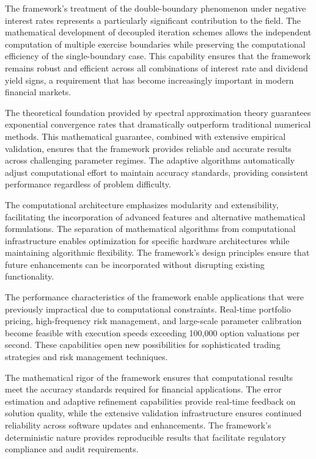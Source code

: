 \documentclass[
  american,
  11pt,
  11pt,
  letterpaper,
  onecolumn]{article}
\begin{document}
The framework's treatment of the double-boundary phenomenon under
negative interest rates represents a particularly significant
contribution to the field. The mathematical development of decoupled
iteration schemes allows the independent computation of multiple
exercise boundaries while preserving the computational efficiency of the
single-boundary case. This capability ensures that the framework remains
robust and efficient across all combinations of interest rate and
dividend yield signs, a requirement that has become increasingly
important in modern financial markets.

The theoretical foundation provided by spectral approximation theory
guarantees exponential convergence rates that dramatically outperform
traditional numerical methods. This mathematical guarantee, combined
with extensive empirical validation, ensures that the framework provides
reliable and accurate results across challenging parameter regimes. The
adaptive algorithms automatically adjust computational effort to
maintain accuracy standards, providing consistent performance regardless
of problem difficulty.

The computational architecture emphasizes modularity and extensibility,
facilitating the incorporation of advanced features and alternative
mathematical formulations. The separation of mathematical algorithms
from computational infrastructure enables optimization for specific
hardware architectures while maintaining algorithmic flexibility. The
framework's design principles ensure that future enhancements can be
incorporated without disrupting existing functionality.

The performance characteristics of the framework enable applications
that were previously impractical due to computational constraints.
Real-time portfolio pricing, high-frequency risk management, and
large-scale parameter calibration become feasible with execution speeds
exceeding 100,000 option valuations per second. These capabilities open
new possibilities for sophisticated trading strategies and risk
management techniques.

The mathematical rigor of the framework ensures that computational
results meet the accuracy standards required for financial applications.
The error estimation and adaptive refinement capabilities provide
real-time feedback on solution quality, while the extensive validation
infrastructure ensures continued reliability across software updates and
enhancements. The framework's deterministic nature provides reproducible
results that facilitate regulatory compliance and audit requirements.
\end{document}
